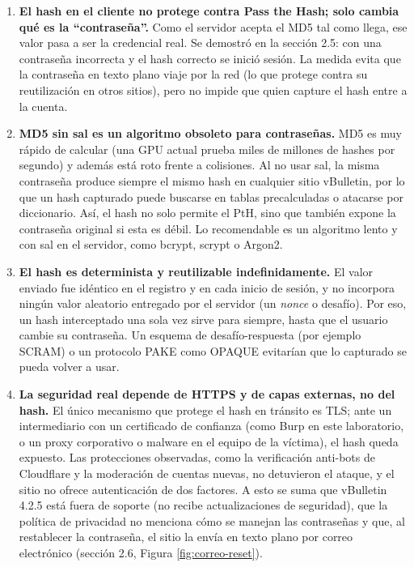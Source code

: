 \documentclass[letter,12pt]{article}
\begin{document}
\begin{enumerate}
    \item \textbf{El hash en el cliente no protege contra Pass the Hash; solo cambia qué es la ``contraseña''.} Como el servidor acepta el MD5 tal como llega, ese valor pasa a ser la credencial real. Se demostró en la sección 2.5: con una contraseña incorrecta y el hash correcto se inició sesión. La medida evita que la contraseña en texto plano viaje por la red (lo que protege contra su reutilización en otros sitios), pero no impide que quien capture el hash entre a la cuenta.

    \item \textbf{MD5 sin sal es un algoritmo obsoleto para contraseñas.} MD5 es muy rápido de calcular (una GPU actual prueba miles de millones de hashes por segundo) y además está roto frente a colisiones. Al no usar sal, la misma contraseña produce siempre el mismo hash en cualquier sitio vBulletin, por lo que un hash capturado puede buscarse en tablas precalculadas o atacarse por diccionario. Así, el hash no solo permite el PtH, sino que también expone la contraseña original si esta es débil. Lo recomendable es un algoritmo lento y con sal en el servidor, como bcrypt, scrypt o Argon2.

    \item \textbf{El hash es determinista y reutilizable indefinidamente.} El valor enviado fue idéntico en el registro y en cada inicio de sesión, y no incorpora ningún valor aleatorio entregado por el servidor (un \textit{nonce} o desafío). Por eso, un hash interceptado una sola vez sirve para siempre, hasta que el usuario cambie su contraseña. Un esquema de desafío-respuesta (por ejemplo SCRAM) o un protocolo PAKE como OPAQUE evitarían que lo capturado se pueda volver a usar.

    \item \textbf{La seguridad real depende de HTTPS y de capas externas, no del hash.} El único mecanismo que protege el hash en tránsito es TLS; ante un intermediario con un certificado de confianza (como Burp en este laboratorio, o un proxy corporativo o malware en el equipo de la víctima), el hash queda expuesto. Las protecciones observadas, como la verificación anti-bots de Cloudflare y la moderación de cuentas nuevas, no detuvieron el ataque, y el sitio no ofrece autenticación de dos factores. A esto se suma que vBulletin 4.2.5 está fuera de soporte (no recibe actualizaciones de seguridad), que la política de privacidad no menciona cómo se manejan las contraseñas y que, al restablecer la contraseña, el sitio la envía en texto plano por correo electrónico (sección 2.6, Figura \ref{fig:correo-reset}).
\end{enumerate}
\end{document}
